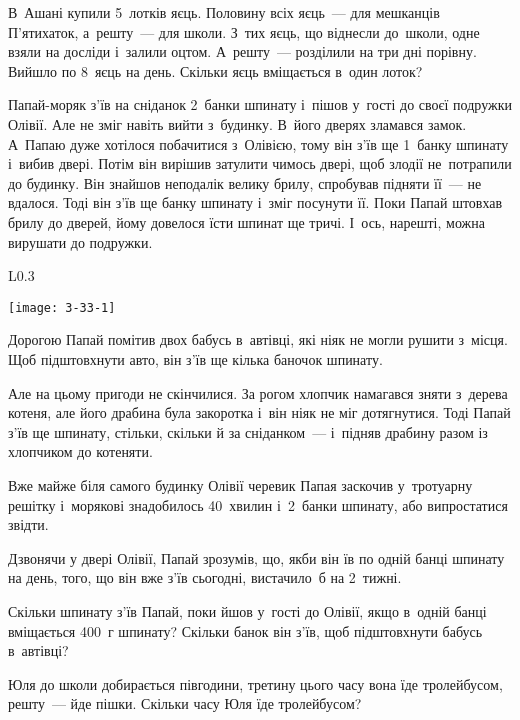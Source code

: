 \problem
В~Ашані купили 5~лотків яєць.
Половину всіх яєць~--- для мешканців П'ятихаток, а~решту~--- для школи.
З~тих яєць, що віднесли до~школи, одне взяли на досліди і~залили оцтом.
А~решту~--- розділили на три дні порівну. Вийшло по 8~яєць на день.
Скільки яєць вміщається в~один лоток? 


\problem
Папай-моряк з’їв на сніданок 2~банки шпинату і~пішов у~гості до своєї
подружки Олівії. Але не зміг навіть вийти з~будинку. В~його дверях
зламався замок. А~Папаю дуже хотілося побачитися з~Олівією, тому він
з’їв ще 1~банку шпинату і~вибив двері. Потім він вирішив затулити
чимось двері, щоб злодії не~потрапили до будинку. Він знайшов неподалік
велику брилу, спробував підняти її~--- не вдалося. Тоді він з’їв ще банку
шпинату і~зміг посунути її. Поки Папай штовхав брилу до дверей, йому
довелося їсти шпинат ще тричі. І~ось, нарешті, можна вирушати до подружки.

\begin{wrapfigure}{L}{0.3\textwidth}
  \vspace{-15pt}
  \begin{center}
    \texttt{[image: 3-33-1]}
  \end{center}
  \vspace{-15pt}
\end{wrapfigure}

Дорогою Папай помітив двох бабусь в~автівці, які ніяк не могли рушити
з~місця. Щоб підштовхнути авто, він з’їв ще кілька баночок шпинату.

Але на цьому пригоди не скінчилися. За рогом хлопчик намагався зняти
з~дерева котеня, але його драбина була закоротка і~він ніяк не міг
дотягнутися. Тоді Папай з’їв ще шпинату, стільки, скільки й
за сніданком~--- і~підняв драбину разом із хлопчиком до котеняти.

Вже майже біля самого будинку Олівії черевик Папая заскочив у~тротуарну
решітку і~морякові знадобилось 40~хвилин і~2~банки шпинату,
або випростатися звідти.

Дзвонячи у двері Олівії, Папай зрозумів, що, якби він їв по одній
банці шпинату на день, того, що він вже з’їв сьогодні,
вистачило~б на 2~тижні.

Скільки шпинату з’їв Папай, поки йшов у~гості до Олівії, якщо в~одній
банці вміщається 400~г шпинату?
Скільки банок він з’їв, щоб підштовхнути бабусь в~автівці?


\problem
Юля до школи добирається півгодини,
третину цього часу вона їде тролейбусом, решту~--- йде пішки.
Скільки часу Юля їде тролейбусом?


